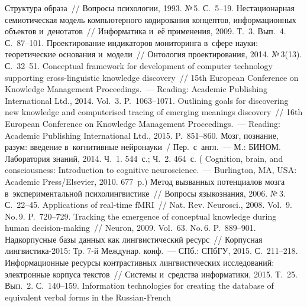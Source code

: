 {\begin{multicols}{2}
{{\begin{thebibliography}{99}
 Структура образа~// Вопросы психологии, 1993. №\,5. С.~5--19.
 Нестационарная семиотическая модель компьютерного кодирования 
концептов, информационных объектов и~денотатов~// Информатика и~её применения, 
2009. Т.~3. Вып.~4. С.~87--101.
 Проектирование индикаторов мониторинга в~сфере 
науки: теоретические основания и~модели~// Онтология проектирования, 2014. №\,3(13). 
С.~32--51.
 Conceptual 
framework for development of computer technology supporting cross-linguistic knowledge 
discovery~// 15th European Conference on Knowledge Management Proceedings.~---  
Reading: Academic Publishing International Ltd., 2014. Vol.~3. P.~1063--1071.
 Outlining goals for discovering new knowledge and 
computerised tracing of emerging meanings discovery~// 16th European Conference on 
Knowledge Management Proceedings.~--- Reading: Academic Publishing International 
Ltd., 2015. P.~851--860.
 Мозг, познание, разум: введение в~когнитивные 
нейронауки~/ Пер.\ с~англ.~--- М.: БИНОМ. Лаборатория знаний, 2014. Ч.~1. 544~с.; Ч.~2. 464~с.
( Cognition, brain, and consciousness: Introduction to cognitive 
neuroscience.~--- Burlington, MA, USA: Academic Press/Elsevier, 2010. 677~p.)
 Метод вызванных потенциалов мозга в~экспериментальной 
психолингвистике~// Вопросы языкознания, 2006. №\,3. С.~22--45.
 Applications of real-time fMRI~// Nat. Rev. Neurosci., 
2008. Vol.~9. No.\,9. P.~720--729.
 Tracking the emergence of 
conceptual knowledge during human decision-making~// Neuron, 2009. Vol.~63. No.\,6. 
P.~889--901.
 Надкорпусные 
базы данных как лингвистический ресурс~// Корпусная лингвистика-2015: Тр. 7-й 
Междунар. конф.~--- СПб.: СПбГУ, 2015. С.~211--218.
 Информационные ресурсы контрастивных лингвистических 
исследований: электронные корпуса текстов~// Системы и~средства информатики, 2015. 
Т.~25. Вып.~2. С.~140--159.
 Information 
technologies for creating the database of equivalent verbal forms in the Russian-French 

\end{thebibliography}}}
\end{multicols}}
